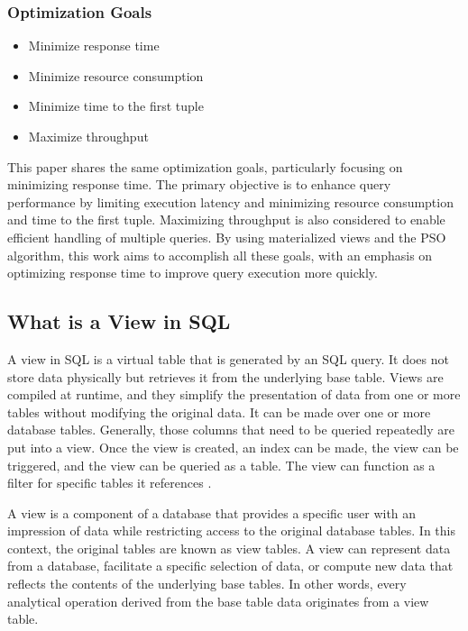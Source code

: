 \subsubsection*{Optimization Goals}

\begin{itemize}
    \item Minimize response time
    \item Minimize resource consumption
    \item Minimize time to the first tuple
    \item Maximize throughput
\end{itemize}\vspace{.4cm}

This paper shares the same optimization goals, particularly focusing on minimizing response time. The primary objective is to enhance query performance by limiting execution latency and minimizing resource consumption and time to the first tuple. Maximizing throughput is also considered to enable efficient handling of multiple queries. By using materialized views and the PSO algorithm, this work aims to accomplish all these goals, with an emphasis on optimizing response time to improve query execution more quickly.



\subsection{What is a View in SQL}
A view in SQL is a virtual table that is generated by an SQL query. It does not store data physically but retrieves it from the underlying base table. Views are compiled at runtime, and they simplify the presentation of data from one or more tables without modifying the original data. It can be made over one or more database tables. Generally, those columns that need to be queried repeatedly are put into a view. Once the view is created, an index can be made, the view can be triggered, and the view can be queried as a table. The view can function as a filter for specific tables it references \cite{chauhan-2024, Rohan_Vats-2024}.\vspace{.4cm}

A view is a component of a database that provides a specific user with an impression of data while restricting access to the original database tables. In this context, the original tables are known as view tables. A view can represent data from a database, facilitate a specific selection of data, or compute new data that reflects the contents of the underlying base tables. In other words, every analytical operation derived from the base table data originates from a view table.\vspace{.4cm}




